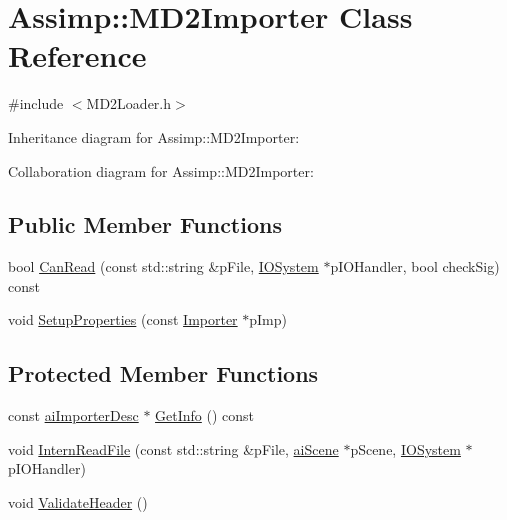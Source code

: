 \hypertarget{class_assimp_1_1_m_d2_importer}{\section{Assimp\+:\+:M\+D2\+Importer Class Reference}
\label{class_assimp_1_1_m_d2_importer}
}


{\ttfamily \#include $<$M\+D2\+Loader.\+h$>$}



Inheritance diagram for Assimp\+:\+:M\+D2\+Importer\+:


Collaboration diagram for Assimp\+:\+:M\+D2\+Importer\+:
\subsection*{Public Member Functions}
\begin{DoxyCompactItemize}
\item 
bool \hyperlink{class_assimp_1_1_m_d2_importer_a7146f942c6ca41d394669ad46f7d05c1}{Can\+Read} (const std\+::string \&p\+File, \hyperlink{class_assimp_1_1_i_o_system}{I\+O\+System} $\ast$p\+I\+O\+Handler, bool check\+Sig) const 
\item 
void \hyperlink{class_assimp_1_1_m_d2_importer_a21b5689b4e166cc89152f9bcf0bd2418}{Setup\+Properties} (const \hyperlink{class_assimp_1_1_importer}{Importer} $\ast$p\+Imp)
\end{DoxyCompactItemize}
\subsection*{Protected Member Functions}
\begin{DoxyCompactItemize}
\item 
const \hyperlink{structai_importer_desc}{ai\+Importer\+Desc} $\ast$ \hyperlink{class_assimp_1_1_m_d2_importer_ab218b47deea315fd6ee8532325a18d97}{Get\+Info} () const 
\item 
void \hyperlink{class_assimp_1_1_m_d2_importer_ac510f399d605f97cecc6001d14f7692a}{Intern\+Read\+File} (const std\+::string \&p\+File, \hyperlink{structai_scene}{ai\+Scene} $\ast$p\+Scene, \hyperlink{class_assimp_1_1_i_o_system}{I\+O\+System} $\ast$p\+I\+O\+Handler)
\item 
void \hyperlink{class_assimp_1_1_m_d2_importer_ae57395ab075dcd025d679ece73afc16c}{Validate\+Header} ()
\end{DoxyCompactItemize}
